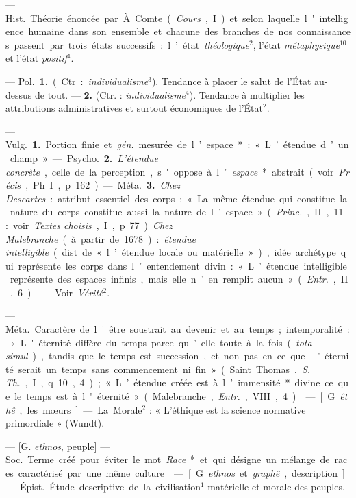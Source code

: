 \begin{itemize}[leftmargin=1cm, label=, itemsep=1pt]
 — \si{Hist.} Théorie
énoncée par À. Comte ({\it Cours}, I) et
selon laquelle l'intelligence humaine
dans son ensemble et chacune des
branches de nos connaissances passent par trois états successifs : l’état
{\it théologique}$^2$, l'état {\it métaphysique}$^{10}$
et l'état {\it positif}$^4$.

 — \si{Pol.} {\bf 1.} (Ctr. : {\it individualisme}$^3$).
Tendance à placer le salut de l'État au-dessus de tout. — {\bf 2.}
(Ctr. : {\it individualisme}$^4$). Tendance à multiplier les attributions
administratives et surtout économiques de l'État$^2$.

 — \si{Vulg.} {\bf 1.} Portion finie et
{\it gén.} mesurée de l’espace* : « L’étendue d’un champ ».

— \si{Psycho.} {\bf 2.} {\it L'étendue concrète},
celle de la perception, s'oppose à
l’{\it espace}* abstrait (voir  {\it Précis}, Ph. I,
p. 162).

— \si{Méta.} {\bf 3.} {\it Chez Descartes} :
attribut essentiel des corps : « La
même étendue qui constitue la nature du corps constitue aussi la
nature de l’espace » ({\it Princ.}, II, 11 :
voir {\it Textes choisis}, I, p. 77). {\it Chez
Malebranche} (à partir de 1678) :
{\it étendue intelligible} (dist. de « l’étendue locale ou matérielle »),
idée archétype qui représente les corps
dans l’entendement divin : « L’étendue intelligible représente des espaces
infinis, mais elle n’en remplit aucun » ({\it Entr.}, II, 6).

 — Voir {\it Vérité}$^2$.

 — \si{Méta.} Caractère de l'être
soustrait au devenir et au temps ;
intemporalité : « L'éternité diffère
du temps parce qu’elle toute à la
fois ({\it tota simul}), tandis que le temps
est succession, et non pas en ce que
l’éternité serait un temps sans commencement ni fin » (Saint Thomas,
{\it S. Th.}, I, q. 10, 4); « L’étendue créée
est à l’immensité* divine ce que le
temps est à l'éternité » (Malebranche, {\it Entr.}, VIII, 4).

 — [G. {\it êthê}, les mœurs] — La
Morale$^2$ : « L’éthique est la science
normative primordiale » (Wundt).

 — [G. {\it ethnos}, peuple] — \si{Soc.}
Terme créé pour éviter le mot {\it Race}*
et qui désigne un mélange de races
caractérisé par une même culture.

 — [G. {\it ethnos} et {\it graphê},
description] — \si{Épist.} Étude descriptive de la civilisation$^1$ matérielle et morale des peuples.


\end{itemize}
